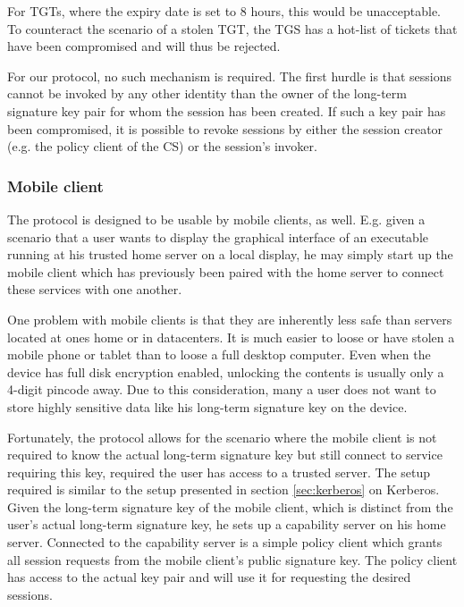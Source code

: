 For TGTs, where the expiry date is set to 8 hours, this would be unacceptable.
To counteract the scenario of a stolen TGT, the TGS has a hot-list of tickets that have been compromised and will thus be rejected.

For our protocol, no such mechanism is required.
The first hurdle is that sessions cannot be invoked by any other identity than the owner of the long-term signature key pair for whom the session has been created.
If such a key pair has been compromised, it is possible to revoke sessions by either the session creator (e.g. the policy client of the CS) or the session's invoker.

\subsubsection{Mobile client}

The protocol is designed to be usable by mobile clients, as well.
E.g. given a scenario that a user wants to display the graphical interface of an executable running at his trusted home server on a local display, he may simply start up the mobile client which has previously been paired with the home server to connect these services with one another.

One problem with mobile clients is that they are inherently less safe than servers located at ones home or in datacenters.
It is much easier to loose or have stolen a mobile phone or tablet than to loose a full desktop computer.
Even when the device has full disk encryption enabled, unlocking the contents is usually only a 4-digit pincode away.
Due to this consideration, many a user does not want to store highly sensitive data like his long-term signature key on the device.

Fortunately, the protocol allows for the scenario where the mobile client is not required to know the actual long-term signature key but still connect to service requiring this key, required the user has access to a trusted server.
The setup required is similar to the setup presented in section \ref{sec:kerberos} on Kerberos.
Given the long-term signature key of the mobile client, which is distinct from the user's actual long-term signature key, he sets up a capability server on his home server.
Connected to the capability server is a simple policy client which grants all session requests from the mobile client's public signature key.
The policy client has access to the actual key pair and will use it for requesting the desired sessions.

